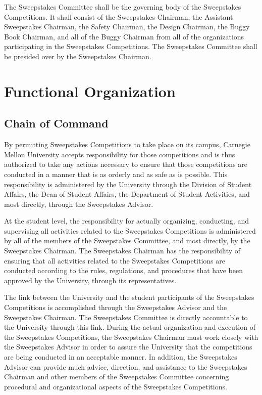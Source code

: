 	The Sweepstakes Committee shall be the governing body of the Sweepstakes Competitions. It shall consist of the Sweepstakes Chairman, the Assistant Sweepstakes Chairman, the Safety Chairman, the Design Chairman, the Buggy Book Chairman, and all of the Buggy Chairman from all of the organizations participating in the Sweepstakes Competitions. The Sweepstakes Committee shall be presided over by the Sweepstakes Chairman.

\section{Functional Organization}

\subsection{Chain of Command}

	By permitting Sweepstakes Competitions to take place on its campus, Carnegie Mellon University accepts responsibility for those competitions and is thus authorized to take any actions necessary to ensure that those competitions are conducted in a manner that is as orderly and as safe as is possible. This responsibility is administered by the University through the Division of Student Affairs, the Dean of Student Affairs, the Department of Student Activities, and most directly, through the Sweepstakes Advisor.

	At the student level, the responsibility for actually organizing, conducting, and supervising all activities related to the Sweepstakes Competitions is administered by all of the members of the Sweepstakes Committee, and most directly, by the Sweepstakes Chairman. The Sweepstakes Chairman has the responsibility of ensuring that all activities related to the Sweepstakes Competitions are conducted according to the rules, regulations, and procedures that have been approved by the University, through its representatives.

	The link between the University and the student participants of the Sweepstakes Competitions is accomplished through the Sweepstakes Advisor and the Sweepstakes Chairman. The Sweepstakes Committee is directly accountable to the University through this link. During the actual organization and execution of the Sweepstakes Competitions, the Sweepstakes Chairman must work closely with the Sweepstakes Advisor in order to assure the University that the competitions are being conducted in an acceptable manner. In addition, the Sweepstakes Advisor can provide much advice, direction, and assistance to the Sweepstakes Chairman and other members of the Sweepstakes Committee concerning procedural and organizational aspects of the Sweepstakes Competitions.

